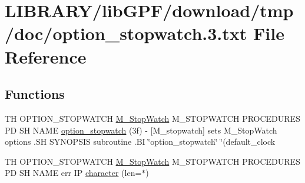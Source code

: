\hypertarget{option__stopwatch_83_8txt}{}\section{L\+I\+B\+R\+A\+R\+Y/lib\+G\+P\+F/download/tmp/doc/option\+\_\+stopwatch.3.txt File Reference}
\label{option__stopwatch_83_8txt}
\subsection*{Functions}
\begin{DoxyCompactItemize}
\item 
TH O\+P\+T\+I\+O\+N\+\_\+\+S\+T\+O\+P\+W\+A\+T\+CH \hyperlink{option__stopwatch_83_8txt_aa2011fc45a5e502e87ee50996a8a9305}{M\+\_\+\+Stop\+Watch} M\+\_\+\+S\+T\+O\+P\+W\+A\+T\+CH P\+R\+O\+C\+E\+D\+U\+R\+ES PD SH N\+A\+ME \hyperlink{option__stopwatch_83_8txt_a072343f3f6ffc9c62d2c380e17f7de21}{option\+\_\+stopwatch} (3f) -\/ \mbox{[}\+M\+\_\+stopwatch\mbox{]} sets M\+\_\+\+Stop\+Watch options .\+S\+H S\+Y\+N\+O\+P\+S\+I\+S subroutine .\+B\+I \char`\"{}option\+\_\+stopwatch\char`\"{} \char`\"{}(default\+\_\+clock
\item 
TH O\+P\+T\+I\+O\+N\+\_\+\+S\+T\+O\+P\+W\+A\+T\+CH \hyperlink{option__stopwatch_83_8txt_aa2011fc45a5e502e87ee50996a8a9305}{M\+\_\+\+Stop\+Watch} M\+\_\+\+S\+T\+O\+P\+W\+A\+T\+CH P\+R\+O\+C\+E\+D\+U\+R\+ES PD SH N\+A\+ME err IP \hyperlink{option__stopwatch_83_8txt_abd4b21fbbd175834027b5224bfe97e66}{character} (len=$\ast$)
\item 

\end{DoxyCompactItemize}
